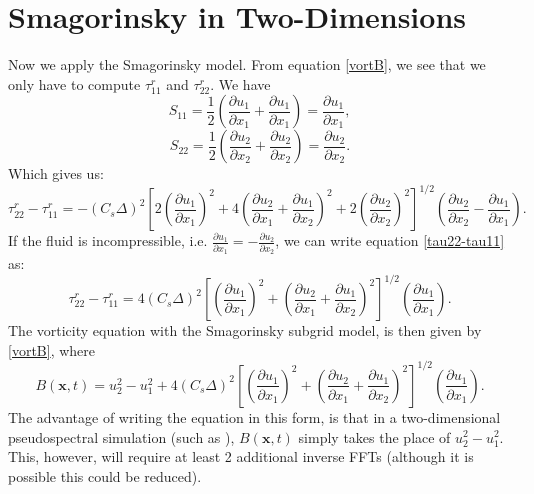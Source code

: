 \documentclass[11pt,a4paper]{article}
\begin{document}
\section{Smagorinsky in Two-Dimensions}
Now we apply the Smagorinsky model. From equation \ref{vortB}, we see that we only have to compute $\tau^r_{11}$ and $\tau^r_{22}$. We have 
$${S}_{11} = \frac{1}{2}\left( \frac{\partial {u}_1}{\partial x_1} + \frac{\partial {u}_1}{\partial x_1}\right) = \frac{\partial {u}_1}{\partial x_1},$$
$${S}_{22} = \frac{1}{2}\left( \frac{\partial {u}_2}{\partial x_2} + \frac{\partial {u}_2}{\partial x_2}\right) = \frac{\partial {u}_2}{\partial x_2}.$$
Which gives us:
\begin{equation}\label{tau22-tau11}
\tau_{22}^r - \tau_{11}^r= -(C_s \Delta)^2\left[2\left( \frac{\partial {u}_1}{\partial x_1}\right)^2+4\left( \frac{\partial {u}_2}{\partial x_1} + \frac{\partial {u}_1}{\partial x_2}\right)^2+2\left( \frac{\partial {u}_2}{\partial x_2}\right)^2 \right]^{1/2}\left(\frac{\partial {u}_2}{\partial x_2} - \frac{\partial {u}_1}{\partial x_1}\right).
\end{equation}
If the fluid is incompressible, i.e. $\frac{\partial {u}_1}{\partial x_1} = -\frac{\partial {u}_2}{\partial x_2}$, we can write equation \ref{tau22-tau11} as:
$$\tau_{22}^r - \tau_{11}^r= 4(C_s \Delta)^2\left[\left( \frac{\partial {u}_1}{\partial x_1}\right)^2+\left( \frac{\partial {u}_2}{\partial x_1} + \frac{\partial {u}_1}{\partial x_2}\right)^2 \right]^{1/2}\left(\frac{\partial {u}_1}{\partial x_1}\right).$$
The vorticity equation with the Smagorinsky subgrid model, is then given by \ref{vortB}, where
$$B(\boldsymbol{x}, t) = u_2^2-u_1^2+4(C_s \Delta)^2\left[\left( \frac{\partial {u}_1}{\partial x_1}\right)^2+\left( \frac{\partial {u}_2}{\partial x_1} + \frac{\partial {u}_1}{\partial x_2}\right)^2 \right]^{1/2}\left(\frac{\partial {u}_1}{\partial x_1}\right).$$
The advantage of writing the equation in this form, is that in a two-dimensional pseudospectral simulation (such as ), $B(\boldsymbol{x},t)$ simply takes the place of $u_2^2 - u_1^2$. This, however, will require at least 2 additional inverse FFTs (although it is possible this could be reduced).
\end{document}
